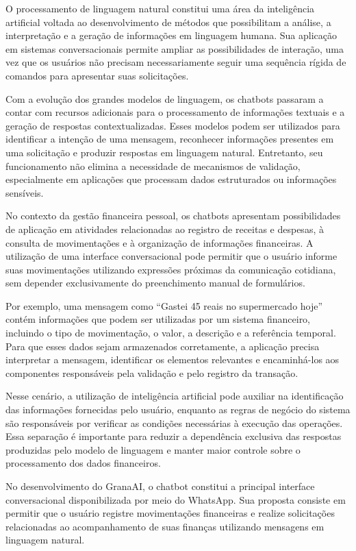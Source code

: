 O processamento de linguagem natural constitui uma área da inteligência artificial voltada ao desenvolvimento de métodos que possibilitam a análise, a interpretação e a geração de informações em linguagem humana. Sua aplicação em sistemas conversacionais permite ampliar as possibilidades de interação, uma vez que os usuários não precisam necessariamente seguir uma sequência rígida de comandos para apresentar suas solicitações.

Com a evolução dos grandes modelos de linguagem, os chatbots passaram a contar com recursos adicionais para o processamento de informações textuais e a geração de respostas contextualizadas. Esses modelos podem ser utilizados para identificar a intenção de uma mensagem, reconhecer informações presentes em uma solicitação e produzir respostas em linguagem natural. Entretanto, seu funcionamento não elimina a necessidade de mecanismos de validação, especialmente em aplicações que processam dados estruturados ou informações sensíveis.

No contexto da gestão financeira pessoal, os chatbots apresentam possibilidades de aplicação em atividades relacionadas ao registro de receitas e despesas, à consulta de movimentações e à organização de informações financeiras. A utilização de uma interface conversacional pode permitir que o usuário informe suas movimentações utilizando expressões próximas da comunicação cotidiana, sem depender exclusivamente do preenchimento manual de formulários.

Por exemplo, uma mensagem como “Gastei 45 reais no supermercado hoje” contém informações que podem ser utilizadas por um sistema financeiro, incluindo o tipo de movimentação, o valor, a descrição e a referência temporal. Para que esses dados sejam armazenados corretamente, a aplicação precisa interpretar a mensagem, identificar os elementos relevantes e encaminhá-los aos componentes responsáveis pela validação e pelo registro da transação.

Nesse cenário, a utilização de inteligência artificial pode auxiliar na identificação das informações fornecidas pelo usuário, enquanto as regras de negócio do sistema são responsáveis por verificar as condições necessárias à execução das operações. Essa separação é importante para reduzir a dependência exclusiva das respostas produzidas pelo modelo de linguagem e manter maior controle sobre o processamento dos dados financeiros.

No desenvolvimento do GranaAI, o chatbot constitui a principal interface conversacional disponibilizada por meio do WhatsApp. Sua proposta consiste em permitir que o usuário registre movimentações financeiras e realize solicitações relacionadas ao acompanhamento de suas finanças utilizando mensagens em linguagem natural.

